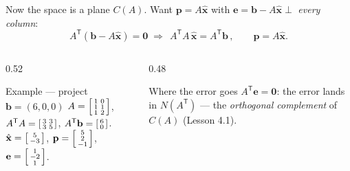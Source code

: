 \documentclass[aspectratio=169, 11pt]{beamer}
\newcommand{\xx}{\mathbf{x}}
\newcommand{\bb}{\mathbf{b}}
\newcommand{\pp}{\mathbf{p}}
\newcommand{\ee}{\mathbf{e}}
\newcommand{\zero}{\mathbf{0}}
\newcommand{\T}{\mathsf{T}}
\begin{document}
\begin{frame}[t, plain]
  Now the space is a plane $C(A)$. Want $\pp=A\hat{\xx}$ with $\ee=\bb-A\hat{\xx}\perp$ \emph{every column}:
  \[
    A^{\T}(\bb-A\hat{\xx})=\zero \;\Longrightarrow\; \boxed{\,A^{\T}A\,\hat{\xx}=A^{\T}\bb\,},\qquad \pp=A\hat{\xx}.
  \]
  \begin{columns}[T]
    \begin{column}{0.52\textwidth}
      \begin{block}{Example --- project $\bb=(6,0,0)$}
        $A=\begin{bsmallmatrix} 1 & 0\\ 1 & 1\\ 1 & 2 \end{bsmallmatrix}$,\;
        $A^{\T}A=\begin{bsmallmatrix} 3 & 3\\ 3 & 5 \end{bsmallmatrix}$,\;
        $A^{\T}\bb=\begin{bsmallmatrix} 6\\ 0 \end{bsmallmatrix}$.\\[3pt]
        $\hat{\xx}=\begin{bsmallmatrix} 5\\ -3 \end{bsmallmatrix}$, \;
        $\pp=\begin{bsmallmatrix} 5\\ 2\\ -1 \end{bsmallmatrix}$, \;
        $\ee=\begin{bsmallmatrix} 1\\ -2\\ 1 \end{bsmallmatrix}$.
      \end{block}
    \end{column}
    \begin{column}{0.48\textwidth}
      \begin{block}{Where the error goes}
        $A^{\T}\ee=\zero$: the error lands in $N(A^{\T})$ --- the \emph{orthogonal complement} of $C(A)$
        (Lesson 4.1).
      \end{block}
    \end{column}
  \end{columns}
\end{frame}
\end{document}
